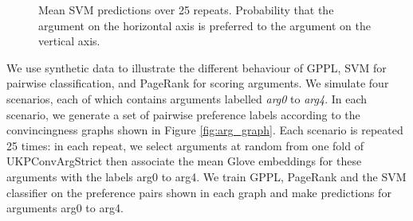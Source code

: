 \begin{figure}[t]
\centering
{}
\caption{Mean SVM predictions over 25 repeats. Probability that the argument 
on the horizontal axis is preferred to the argument on the vertical axis.}
\label{fig:svm_classification}
\end{figure}

We use synthetic data to illustrate the different behaviour of GPPL, SVM for pairwise classification,
and PageRank for scoring arguments.
We simulate four scenarios, each of which contains arguments labelled \emph{arg0} to \emph{arg4}.  
In each scenario, we generate a set of pairwise preference labels according to the 
convincingness graphs shown in Figure \ref{fig:arg_graph}.
Each scenario is repeated 25 times: in each repeat, we select arguments at random from one fold of UKPConvArgStrict
then associate the mean Glove embeddings for these arguments with the labels arg0 to arg4. 
We train GPPL, PageRank and the SVM classifier on the preference pairs shown in each graph and
make predictions for arguments arg0 to arg4.

